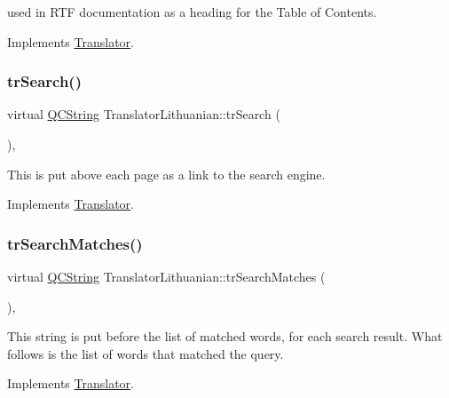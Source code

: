 used in R\+TF documentation as a heading for the Table of Contents. 

Implements \mbox{\hyperlink{class_translator}{Translator}}.

\mbox{\label{class_translator_lithuanian_ac5417f40e9c69b9f84c1744caa049da8}} 
\subsubsection{\texorpdfstring{trSearch()}{trSearch()}}
{\footnotesize\ttfamily virtual \mbox{\hyperlink{class_q_c_string}{Q\+C\+String}} Translator\+Lithuanian\+::tr\+Search (\begin{DoxyParamCaption}{ }\end{DoxyParamCaption})\hspace{0.3cm}{\ttfamily [inline]}, {\ttfamily [virtual]}}

This is put above each page as a link to the search engine. 

Implements \mbox{\hyperlink{class_translator}{Translator}}.

\mbox{\label{class_translator_lithuanian_afc1d35109226264fad29a911b77b5cf4}} 
\subsubsection{\texorpdfstring{trSearchMatches()}{trSearchMatches()}}
{\footnotesize\ttfamily virtual \mbox{\hyperlink{class_q_c_string}{Q\+C\+String}} Translator\+Lithuanian\+::tr\+Search\+Matches (\begin{DoxyParamCaption}{ }\end{DoxyParamCaption})\hspace{0.3cm}{\ttfamily [inline]}, {\ttfamily [virtual]}}

This string is put before the list of matched words, for each search result. What follows is the list of words that matched the query. 

Implements \mbox{\hyperlink{class_translator}{Translator}}.

\mbox{\label{class_translator_lithuanian_ab956a8bf7c0dbdfb14ca45171e59af8e}} 

